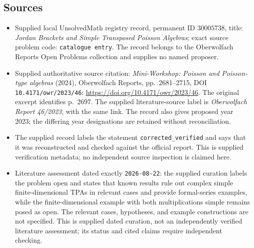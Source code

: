 \documentclass[11pt]{article}
\begin{document}
\subsection{Sources}
\begin{itemize}
\item Supplied local UnsolvedMath registry record, permanent ID \(30005738\), title: \emph{Jordan Brackets and Simple Transposed Poisson Algebras}; exact source problem code: \texttt{catalogue entry}. The record belongs to the Oberwolfach Reports Open Problems collection and supplies no named proposer.
\item Supplied authoritative source citation: \emph{Mini-Workshop: Poisson and Poisson-type algebras} (2024), Oberwolfach Reports, pp.\ 2681--2715, DOI \texttt{10.4171/owr/2023/46}: \url{https://doi.org/10.4171/owr/2023/46}. The original excerpt identifies p.\ 2697. The supplied literature-source label is \emph{Oberwolfach Report 46/2023}, with the same link. The record also gives proposed year 2023; the differing year designations are retained without reconciliation.
\item The supplied record labels the statement \texttt{corrected\_verified} and says that it was reconstructed and checked against the official report. This is supplied verification metadata; no independent source inspection is claimed here.
\item Literature assessment dated exactly \texttt{2026-08-22}: the supplied curation labels the problem open and states that known results rule out complex simple finite-dimensional TPAs in relevant cases and provide formal-series examples, while the finite-dimensional example with both multiplications simple remains posed as open. The relevant cases, hypotheses, and example constructions are not specified. This is supplied dated curation, not an independently verified literature assessment; its status and cited claims require independent checking.
\end{itemize}
\end{document}
